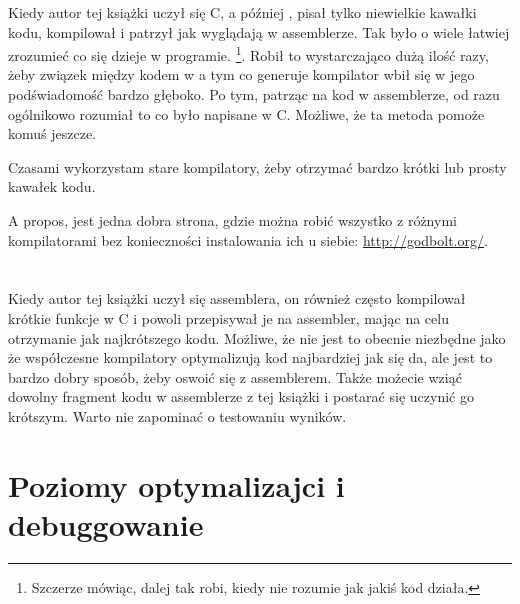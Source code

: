
Kiedy autor tej książki uczył się C, a później \CCpp, pisał tylko niewielkie kawałki kodu, kompilował i patrzył jak wyglądają w assemblerze. Tak było o wiele łatwiej zrozumieć co się dzieje w programie.%
\footnote{Szczerze mówiąc, dalej tak robi, kiedy nie rozumie jak jakiś kod działa.}.
Robił to wystarczająco dużą ilość razy, żeby związek między kodem w \CCpp a tym co generuje kompilator wbił się w jego podświadomość bardzo głęboko. Po tym, patrząc na kod w assemblerze, od razu ogólnikowo rozumiał to co było napisane w C. Możliwe, że ta metoda pomoże komuś jeszcze.


Czasami wykorzystam stare kompilatory, żeby otrzymać bardzo krótki lub prosty kawałek kodu.

A propos, jest jedna dobra strona, gdzie można robić wszystko z różnymi kompilatorami bez konieczności instalowania ich u siebie: \url{http://godbolt.org/}.

\section*{\Exercises}

Kiedy autor tej książki uczył się assemblera, on również często kompilował krótkie funkcje w C i powoli przepisywał je na assembler, mając na celu otrzymanie jak najkrótszego kodu. Możliwe, że nie jest to obecnie niezbędne jako że współczesne kompilatory optymalizują kod najbardziej jak się da, ale jest to bardzo dobry sposób, żeby oswoić się z assemblerem. Także możecie wziąć dowolny fragment kodu w assemblerze z tej książki i postarać się uczynić go krótszym. Warto nie zapominać o testowaniu wyników.

\section*{Poziomy optymalizajci i debuggowanie}

